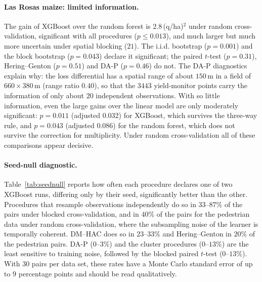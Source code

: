 \paragraph{Las Rosas maize: limited information.} The gain of XGBoost over the random forest is $2.8$\,(q/ha)$^2$ under random cross-validation, significant with all procedures ($p\le0.013$), and much larger but much more uncertain under spatial blocking ($21$). The i.i.d. bootstrap ($p=0.001$) and the block bootstrap ($p=0.043$) declare it significant; the paired $t$-test ($p=0.31$), Hering--Genton ($p=0.51$) and DA-P ($p=0.46$) do not. The DA-P diagnostics explain why: the loss differential has a spatial range of about $150$\,m in a field of $660\times380$\,m (range ratio $0.40$), so that the $3443$ yield-monitor points carry the information of only about $20$ independent observations. With so little information, even the large gains over the linear model are only moderately significant: $p=0.011$ (adjusted $0.032$) for XGBoost, which survives the three-way rule, and $p=0.043$ (adjusted $0.086$) for the random forest, which does not survive the correction for multiplicity. Under random cross-validation all of these comparisons appear decisive.

\paragraph{Seed-null diagnostic.} Table~\ref{tab:seednull} reports how often each procedure declares one of two XGBoost runs, differing only by their seed, significantly better than the other. Procedures that resample observations independently do so in $33$--$87\%$ of the pairs under blocked cross-validation, and in $40\%$ of the pairs for the pedestrian data under random cross-validation, where the subsampling noise of the learner is temporally coherent. DM--HAC does so in $23$--$33\%$ and Hering--Genton in $20\%$ of the pedestrian pairs. DA-P ($0$--$3\%$) and the cluster procedures ($0$--$13\%$) are the least sensitive to training noise, followed by the blocked paired $t$-test ($0$--$13\%$). With $30$ pairs per data set, these rates have a Monte Carlo standard error of up to $9$ percentage points and should be read qualitatively.

